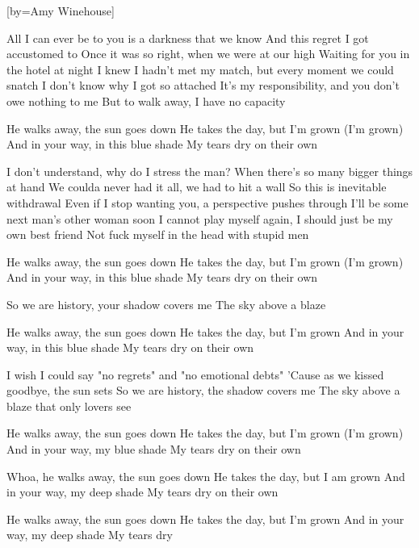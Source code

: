 [by={Amy Winehouse}]

  \beginverse
  All I can ever be to you is a darkness that we know
  And this regret I got accustomed to
  Once it was so right, when we were at our high
  Waiting for you in the hotel at night
  I knew I hadn't met my match, but every moment we could snatch
  I don't know why I got so attached
  It's my responsibility, and you don't owe nothing to me
  But to walk away, I have no capacity
  \endverse

  \beginverse
  He walks away, the sun goes down
  He takes the day, but I'm grown (I'm grown)
  And in your way, in this blue shade
  My tears dry on their own
  \endverse

  \beginverse
  I don't understand, why do I stress the man?
  When there's so many bigger things at hand
  We coulda never had it all, we had to hit a wall
  So this is inevitable withdrawal
  Even if I stop wanting you, a perspective pushes through
  I'll be some next man's other woman soon
  I cannot play myself again, I should just be my own best friend
  Not fuck myself in the head with stupid men
  \endverse

  \beginverse
  He walks away, the sun goes down
  He takes the day, but I'm grown (I'm grown)
  And in your way, in this blue shade
  My tears dry on their own
  \endverse

  \beginverse
  So we are history, your shadow covers me
  The sky above a blaze
  \endverse

  \beginverse
  He walks away, the sun goes down
  He takes the day, but I'm grown
  And in your way, in this blue shade
  My tears dry on their own
  \endverse

  \beginverse
  I wish I could say "no regrets" and "no emotional debts"
  'Cause as we kissed goodbye, the sun sets
  So we are history, the shadow covers me
  The sky above a blaze that only lovers see
  \endverse

  \beginverse
  He walks away, the sun goes down
  He takes the day, but I'm grown (I'm grown)
  And in your way, my blue shade
  My tears dry on their own
  \endverse

  \beginverse
  Whoa, he walks away, the sun goes down
  He takes the day, but I am grown
  And in your way, my deep shade
  My tears dry on their own
  \endverse

  \beginverse
  He walks away, the sun goes down
  He takes the day, but I'm grown
  And in your way, my deep shade
  My tears dry
  \endverse
\endsong
